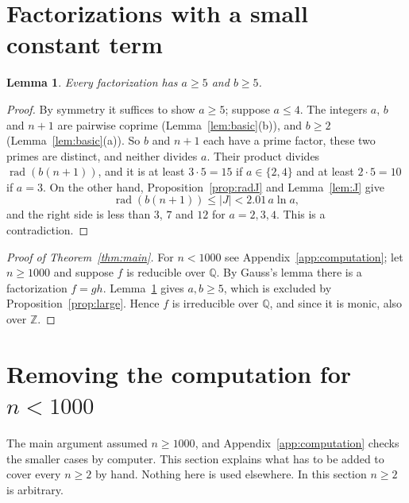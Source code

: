 \documentclass[11pt]{amsart}
\newtheorem{lemma}[theorem]{Lemma}
\theoremstyle{definition}
\theoremstyle{remark}
\numberwithin{equation}{section}
\newcommand{\Q}{\mathbb{Q}}
\newcommand{\Z}{\mathbb{Z}}
\newcommand{\rad}{\operatorname{rad}}
\begin{document}
\section{Factorizations with a small constant term}\label{sec:small}

\begin{lemma}\label{lem:small}
Every factorization has $a\ge5$ and $b\ge5$.
\end{lemma}

\begin{proof}
By symmetry it suffices to show $a\ge5$; suppose $a\le4$. The integers $a$,
$b$ and $n+1$ are pairwise coprime (Lemma~\ref{lem:basic}(b)), and $b\ge2$
(Lemma~\ref{lem:basic}(a)). So $b$ and $n+1$ each have a prime factor, these
two primes are distinct, and neither divides $a$. Their product divides
$\rad(b(n+1))$, and it is at least $3\cdot5=15$ if $a\in\{2,4\}$ and at
least $2\cdot5=10$ if $a=3$. On the other hand, Proposition~\ref{prop:radJ}
and Lemma~\ref{lem:J} give
\[
 \rad(b(n+1))\le|J|<2.01\,a\ln a,
\]
and the right side is less than $3$, $7$ and $12$ for $a=2,3,4$. This is a
contradiction.
\end{proof}

\begin{proof}[Proof of Theorem~\ref{thm:main}]
For $n<1000$ see Appendix~\ref{app:computation}; let $n\ge1000$ and suppose
$f$ is reducible over $\Q$. By Gauss's lemma there is a
factorization $f=gh$. Lemma~\ref{lem:small}
gives $a,b\ge5$, which is excluded by Proposition~\ref{prop:large}. Hence $f$
is irreducible over $\Q$, and since it is monic, also over $\Z$.
\end{proof}

\section{Removing the computation for \texorpdfstring{$n<1000$}{n < 1000}}\label{sec:smalln}

The main argument assumed $n\ge1000$, and Appendix~\ref{app:computation}
checks the smaller cases by computer. This section explains what has to be
added to cover every $n\ge2$ by hand. Nothing here is used elsewhere. In this
section $n\ge2$ is arbitrary.
\end{document}
